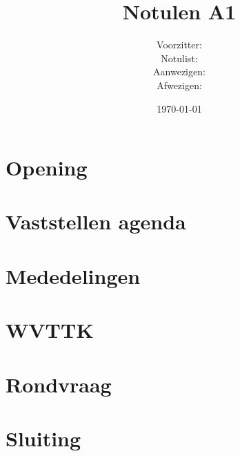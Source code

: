\documentclass[11pt,twoside,a4paper]{article}
\title{Notulen A1}
\author{
Voorzitter:\\
Notulist:\\
Aanwezigen:\\
Afwezigen:\\
}
\date{\today}
\begin{document}
\maketitle

\section{Opening}

\section{Vaststellen agenda}

\section{Mededelingen}

\section{}

\section{}

\section{}

\section{}

\section{WVTTK}

\section{Rondvraag}

\section{Sluiting}
\end{document}
